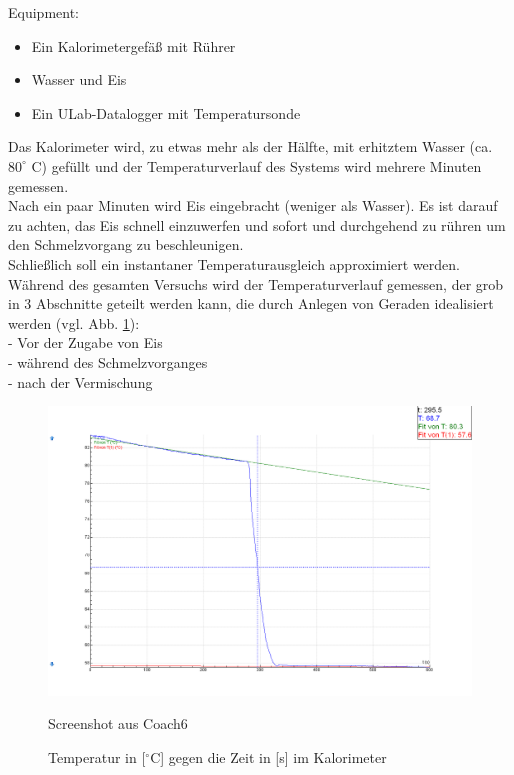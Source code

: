 \documentclass[12pt,a4paper]{article}
\begin{document}
\begin{multicols}{2}
\noindent Equipment:
\begin {itemize}
	\item Ein Kalorimetergefäß mit Rührer
	\item Wasser und Eis
	\item Ein ULab-Datalogger mit Temperatursonde
\end {itemize}
\noindent
Das Kalorimeter wird, zu etwas mehr als der Hälfte, mit erhitztem Wasser (ca. $80^{\circ}$ C) gefüllt und der Temperaturverlauf des Systems wird mehrere Minuten gemessen.\\
Nach ein paar Minuten wird Eis eingebracht (weniger als Wasser). Es ist darauf zu achten, das Eis schnell einzuwerfen und sofort und durchgehend zu rühren um den Schmelzvorgang zu beschleunigen.\\
Schließlich soll ein instantaner Temperaturausgleich approximiert werden.\\
Während des gesamten Versuchs wird der Temperaturverlauf gemessen, der grob in 3 Abschnitte geteilt werden kann, die durch Anlegen von Geraden idealisiert werden (vgl. Abb. \ref{fig:Tempverlauf-Eis}):\\
- Vor der Zugabe von Eis\\
- während des Schmelzvorganges\\
- nach der Vermischung


\end{multicols}

\begin{figure}[H]
	\centering
	\includegraphics[scale=0.35]{./figure/PW4_graph.PNG}
	\caption{Temperatur in [$^\circ$C] gegen die Zeit in [s] im Kalorimeter\ }
	{\centering Screenshot aus Coach6}
	\label{fig:Tempverlauf-Eis}
\end{figure}
\noindent
\end{document}
